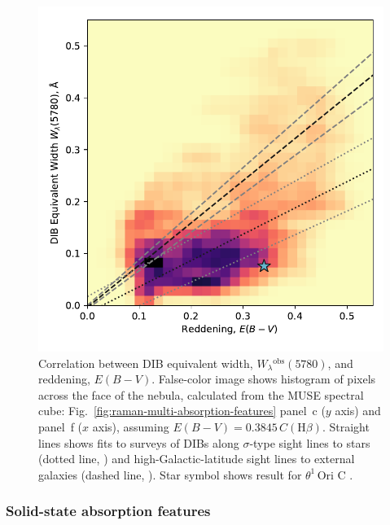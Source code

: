\documentclass[useAMS, usenatbib, a4paper]{mnras}
\def\th#1#2{\ensuremath{\theta^{#1}\,\text{Ori~#2}}}
\newcommand\hb{\ensuremath{\text{H}\beta}}
\newcommand\observed{\ensuremath{^{\text{obs}}}}
\begin{document}






\begin{figure}
  \centering
  \includegraphics[width=\linewidth]{figs/correlation-DIB-reddening}
  \caption{
    Correlation between DIB equivalent width,
    \(W_\lambda\observed(5780)\), and reddening, \(E(B - V)\).
    False-color image shows histogram of pixels across the face of the nebula,
    calculated from the MUSE spectral cube: 
    Fig.~\ref{fig:raman-multi-absorption-features} panel~c (\(y\) axis)
    and panel~f (\(x\) axis), assuming \(E(B - V) = 0.3845\, C(\hb)\).
    Straight lines shows fits to surveys of DIBs along \(\sigma\)-type sight lines
    to stars (dotted line, \citealp{Kos:2013a})
    and high-Galactic-latitude sight lines to external galaxies
    (dashed line, \citealp{Baron:2015a}).
    Star symbol shows result for \th1C \citep{Friedman:2011a}.
  }
  \label{fig:dib-redden}
\end{figure}


\subsubsection{Solid-state absorption features}
\label{sec:solid-state-absorpt}
\end{document}
